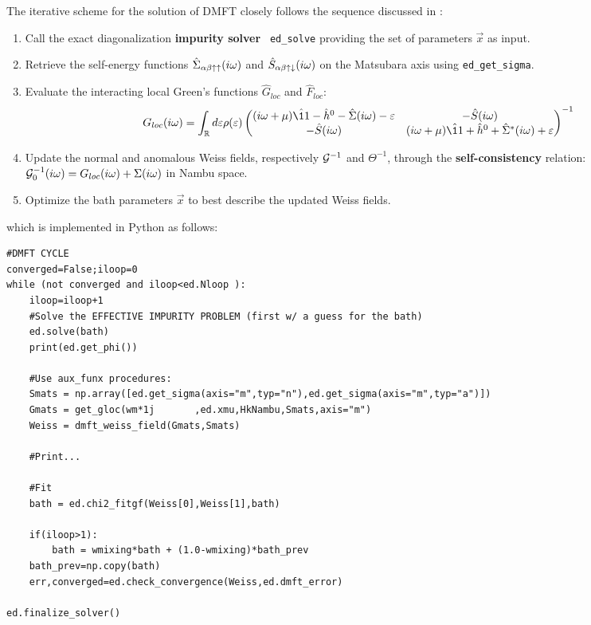 The iterative scheme for the solution of DMFT closely follows the
sequence discussed in :   
\begin{enumerate}
\item Call the exact diagonalization {\bf impurity solver} {\tt
    ed\_solve} providing the set of parameters $\vec{x}$ as input. 
\item Retrieve the self-energy functions
  $\hat{\Sigma}_{\alpha\beta\uparrow\uparrow}(i\omega)$ and $\hat{S}_{\alpha\beta\uparrow\downarrow}(i\omega)$ on the 
  Matsubara axis using {\tt ed\_get\_sigma}.
\item
  Evaluate the interacting local Green's functions $\hat{G}_{loc}$ and
  $\hat{F}_{loc}$:
  \begin{equation}
  G_{loc}(i\omega) =
  \int_\RRR d\e \rho(\e)
  \begin{pmatrix}
    (i\omega +\mu)\hat{\11} - \hat{h}^0 - \hat{\Sigma}(i\omega) -\e & -\hat{S}(i\omega) \\
    -\hat{S}(i\omega) & (i\omega +\mu)\hat{\11} + \hat{h}^0 +
    \hat{\Sigma}^*(i\omega) +\e\\
  \end{pmatrix}^{-1}
\end{equation}
\item Update the normal and anomalous Weiss fields, respectively 
  ${\cal G}^{-1}$ and $\Theta^{-1}$, through the {\bf self-con\-sis\-ten\-cy}
    relation: ${\cal G}^{-1}_0(i\omega) = G_{loc}(i\omega) +
    \Sigma(i\omega)$ in Nambu space. 
  \item Optimize the bath parameters $\vec{x}$ to best describe the  updated
    Weiss fields. 
\end{enumerate}
which is implemented in Python as follows:
\begin{lstlisting}[style=mypython,numbers=none,basicstyle={\scriptsize\ttfamily}]
#DMFT CYCLE
converged=False;iloop=0
while (not converged and iloop<ed.Nloop ):
    iloop=iloop+1
    #Solve the EFFECTIVE IMPURITY PROBLEM (first w/ a guess for the bath)
    ed.solve(bath)
    print(ed.get_phi())
    
    #Use aux_funx procedures:
    Smats = np.array([ed.get_sigma(axis="m",typ="n"),ed.get_sigma(axis="m",typ="a")])    
    Gmats = get_gloc(wm*1j       ,ed.xmu,HkNambu,Smats,axis="m") 
    Weiss = dmft_weiss_field(Gmats,Smats)                  
          
    #Print...

    #Fit
    bath = ed.chi2_fitgf(Weiss[0],Weiss[1],bath)
        
    if(iloop>1):
        bath = wmixing*bath + (1.0-wmixing)*bath_prev
    bath_prev=np.copy(bath) 
    err,converged=ed.check_convergence(Weiss,ed.dmft_error)

ed.finalize_solver()
\end{lstlisting}


